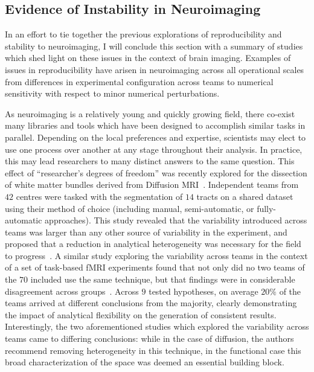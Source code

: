 \subsection{Evidence of Instability in Neuroimaging}
In an effort to tie together the previous explorations of reproducibility and stability to neuroimaging, I will
conclude this section with a summary of studies which shed light on these issues in the context of brain imaging.
Examples of issues in reproducibility have arisen in neuroimaging across all operational scales from differences in
experimental configuration across teams to numerical sensitivity with respect to minor numerical perturbations.

As neuroimaging is a relatively young and quickly growing field, there co-exist many libraries and tools which have been
designed to accomplish similar tasks in parallel. Depending on the local preferences and expertise, scientists
may elect to use one process over another at any stage throughout their analysis. In practice, this may lead researchers
to many distinct answers to the same question. This effect of ``researcher's degrees of freedom'' was recently explored
for the dissection of white matter bundles derived from Diffusion MRI~\cite{schilling2020tractography}. Independent teams
from $42$ centres were tasked with the segmentation of $14$ tracts on a shared dataset using their method of choice
(including manual, semi-automatic, or fully-automatic approaches). This study revealed that the variability introduced
across teams was larger than any other source of variability in the experiment, and proposed that a reduction in
analytical heterogeneity was necessary for the field to progress~\cite{schilling2020tractography}. A similar study
exploring the variability across teams in the context of a set of task-based fMRI
experiments found that not only did no two teams of the $70$ included use the same technique, but that findings were in
considerable disagreement across groups~\cite{botvinik2020variability}. Across $9$ tested hypotheses, on average $20\%$
of the teams arrived at different conclusions from the majority, clearly demonstrating the impact of analytical
flexibility on the generation of consistent results. Interestingly, the two aforementioned studies which explored the
variability across teams came to differing conclusions: while in the case of diffusion, the authors recommend removing
heterogeneity in this technique, in the functional case this broad characterization of the space was deemed an essential
building block.

